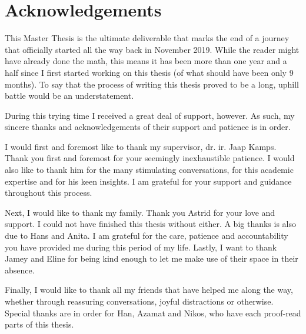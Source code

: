 \chapter*{Acknowledgements}
This Master Thesis is the ultimate deliverable that marks the end of a journey that officially started all the way back in November 2019. While the reader might have already done the math, this means it has been more than one year and a half since I first started working on this thesis (of what should have been only 9 months). To say that the process of writing this thesis proved to be a long, uphill battle would be an understatement.

During this trying time I received a great deal of support, however. As such, my sincere thanks and acknowledgements of their support and patience is in order.

I would first and foremost like to thank my supervisor, dr. ir. Jaap Kamps. Thank you first and foremost for your seemingly inexhaustible patience. I would also like to thank him for the many stimulating conversations, for this academic expertise and for his keen insights. I am grateful for your support and guidance throughout this process.

Next, I would like to thank my family. Thank you Astrid for your love and support. I could not have finished this thesis without either. A big thanks is also due to Hans and Anita. I am grateful for the care, patience and accountability you have provided me during this period of my life. Lastly, I want to thank Jamey and Eline for being kind enough to let me make use of their space in their absence.

Finally, I would like to thank all my friends that have helped me along the way, whether through reassuring conversations, joyful distractions or otherwise. Special thanks are in order for Han, Azamat and Nikos, who have each proof-read parts of this thesis.